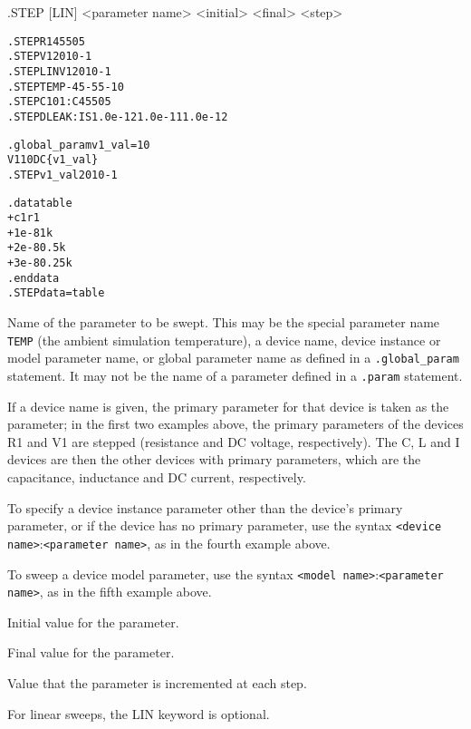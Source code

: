 \begin{Command}

\format
.STEP [LIN] <parameter name> <initial> <final> <step>

\examples
\begin{alltt}
.STEP R1 45 50 5
.STEP V1 20 10 -1
.STEP LIN V1 20 10 -1
.STEP TEMP -45 -55 -10
.STEP C101:C 45 50 5
.STEP DLEAK:IS 1.0e-12 1.0e-11 1.0e-12

.global_param v1_val=10
V1 1 0 DC \{v1_val\}
.STEP v1_val 20 10 -1

.data table
+ c1 r1
+ 1e-8  1k
+ 2e-8  0.5k
+ 3e-8  0.25k
.enddata
.STEP data=table
\end{alltt}

\arguments

\begin{Arguments}

Name of the parameter to be swept.  This may be the special parameter
name \texttt{TEMP} (the ambient simulation temperature), a device
name, device instance or model parameter name, or global parameter
name as defined in a \texttt{.global\_param} statement.  It may not be
the name of a parameter defined in a \texttt{.param} statement.

If a device name is given, the primary parameter for that device is
taken as the parameter; in the first two examples above, the primary
parameters of the devices R1 and V1 are stepped (resistance and DC
voltage, respectively).  The C, L and I devices are then the other
devices with primary parameters, which are the capacitance, inductance 
and DC current, respectively.

To specify a device instance parameter other than the device's primary
parameter, or if the device has no primary parameter, use the 
syntax \texttt{<device name>}:\texttt{<parameter name>}, as
in the fourth example above.

To sweep a device model parameter, use the syntax \texttt{<model
name>}:\texttt{<parameter name>}, as in the fifth example above.

Initial value for the parameter.

Final value for the parameter.

Value that the parameter is incremented at each step.

\end{Arguments}

\comments

For linear sweeps, the LIN keyword is optional.


\end{Command}
